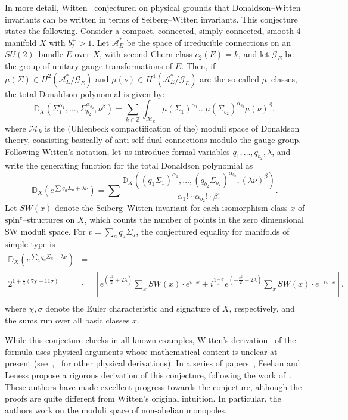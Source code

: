 \documentclass[a4paper,12pt,reqno,sumlimits]{amsart}
\theoremstyle{plain}
\theoremstyle{definition}
\newcommand{\D}{{\mathbb D}}
\newcommand{\Z}{{\mathbb Z}}
\newcommand{\1}{{\bf 1}}
\newcommand{\ex}[1]{{e^{#1}}}
\newcommand{\calA}{{\mathcal A}}
\newcommand{\calG}{{\mathcal G}}
\newcommand{\calM}{{\mathcal M}}
\newcommand{\spinc}{$\text{spin}^c$}
\numberwithin{equation}{section}
\begin{document}
In more detail, Witten~\cite{ewmono} conjectured on physical grounds that
Donaldson--Witten invariants can be written in terms of Seiberg--Witten
invariants. This conjecture states the following.  Consider a compact,
connected, simply-connected, smooth 4--manifold $X$ with $b_2^+>1$.  Let
$\calA^*_E$ be the space of irreducible connections on an $SU(2)$--bundle $E$
over $X$, with second Chern class $c_2(E)=k$, and let $\calG_E$ be the group
of unitary gauge transformations of $E$. Then, if $\mu(\Sigma)\in
H^2(\calA^*_E/\calG_E)$ and $\mu(\nu)\in H^4(\calA^*_E/\calG_E)$ are the
so-called $\mu$--classes, the total Donaldson polynomial is given by:
$$
\D_X(\Sigma_1^{\alpha_1},\dots,\Sigma_{b_2}^{\alpha_{b_2}},\nu^\beta)
=\sum_{k\in\Z}\int_{\calM_k}\mu(\Sigma_1)^{\alpha_1}\dots
\mu(\Sigma_{b_2})^{\alpha_{b_2}}\mu(\nu)^\beta,
$$
where $\calM_k$ is the (Uhlenbeck compactification of the) moduli space of
Donaldson theory, consisting basically of anti-self-dual connections modulo
the gauge group.  Following Witten's notation, let us introduce formal
variables $q_1,\dots,q_{b_2},\lambda$, and write the generating function for
the total Donaldson polynomial as
\begin{equation*}
  \D_X\left(e^{\sum q_a\Sigma_a+\lambda\nu}\right)=
  \sum \frac{\D_X((q_1\Sigma_1)^{\alpha_1},\dots,(q_{b_2}
    \Sigma_{b_2})^{\alpha_{b_2}},(\lambda\nu)^\beta)}{\alpha_1!\cdots
    \alpha_{b_2}!\cdot\beta!}.
\end{equation*}
Let $SW(x)$ denote the Seiberg--Witten invariant for each isomorphism class
$x$ of \spinc--structures on $X$, which counts the number of points in the
zero dimensional SW moduli space.  For $v=\displaystyle\sum_a q_a\Sigma_a$, the
conjectured equality for manifolds of simple type is~\cite{ewmono}
\begin{eqnarray}
  \label{conjintro}
  \D_X(\ex{\sum_a q_a\Sigma_a + \lambda\nu})&=&\nonumber\\
  2^{\scriptstyle{1+\frac{1}{4}(7\chi+11\sigma)}}
  &\cdot&\left[\ex{\left(\frac{v^2}{2}+2\lambda\right)}
    \sum_x SW(x)\cdot\ex{\scriptstyle{v\cdot x}}+i^{\frac{\chi+\sigma}{4}}
    \ex{\left(-\frac{v^2}{2}-2\lambda\right)}
    \sum_x SW(x)\cdot\ex{\scriptstyle{-iv\cdot x}}\right],\nonumber\\
\end{eqnarray}
where $\chi,\sigma$ denote the Euler characteristic and signature of $X$,
respectively, and the sums run over all basic classes $x$.

While this conjecture checks in all known examples, Witten's
derivation~\cite{ewmono} of the formula uses physical arguments whose
mathematical content is unclear at present (see~\cite{radu},~\cite{park} for
other physical derivations). In a series of papers~\cite{feehan}, Feehan and
Leness propose a rigorous derivation of this conjecture, following the work
of~\cite{pt}.  These authors have made excellent progress towards the
conjecture, although the proofs are quite different from Witten's original
intuition.  In particular, the authors work on the moduli space of
non-abelian monopoles.
\end{document}
